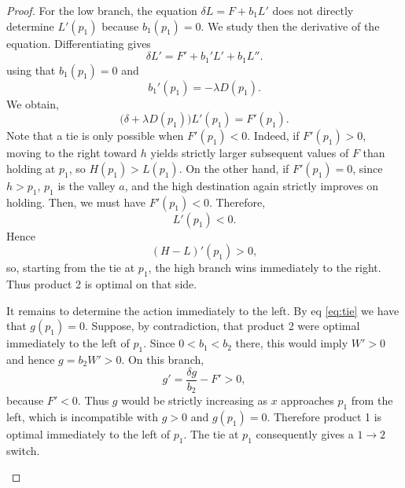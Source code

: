 \documentclass[11pt]{article}
\begin{document}
\begin{proof}
For the low branch, the equation $\delta L=F+b_1L'$ does not directly determine $L'(p_1)$ because $b_1(p_1)=0$. We study then the derivative of the equation. Differentiating gives
\begin{equation*}
    \delta L' = F'+b_1'L'+b_1L''.
\end{equation*}
using that $b_1(p_1)=0$ and 
\begin{equation*}
    b_1'(p_1) = -\lambda D(p_1).
\end{equation*}
We obtain,
\begin{equation*}
    \bigl(\delta+\lambda D(p_1)\bigr)L'(p_1)= F'(p_1).
\end{equation*}
Note that a tie is only possible when $F'(p_1)<0$. Indeed, if $F'(p_1)>0$, moving to the right toward $h$ yields strictly larger subsequent values of $F$ than holding at $p_1$, so $H(p_1)>L(p_1)$. On the other hand, if $F'(p_1)=0$, since $h>p_1$, $p_1$ is the valley $a$, and the high destination again strictly improves on holding. Then, we must have $F'(p_1)<0$. Therefore,
\begin{equation*}
    L'(p_1)<0.
\end{equation*}
Hence
\begin{equation*}
    (H-L)'(p_1)>0,
\end{equation*}
so, starting from the tie at $p_1$, the high branch wins immediately to the right. Thus product 2 is optimal on that side.

It remains to determine the action immediately to the left. By eq \eqref{eq:tie} we have that $g(p_1)=0$. Suppose, by contradiction, that product 2 were optimal immediately to the
left of $p_1$. Since $0<b_1<b_2$ there, this would imply $W'>0$ and hence $g=b_2W'>0$. On this branch,
\begin{equation*}
    g'=\frac{\delta g}{b_2}-F'>0,
\end{equation*}
because $F'<0$. Thus $g$ would be strictly increasing as $x$ approaches $p_1$ from the left, which is incompatible with $g>0$ and $g(p_1)=0$. Therefore product 1 is optimal immediately to the left of $p_1$. The tie at $p_1$ consequently gives a $1\to2$ switch.

\begin{figure}[H]
\centering
{}
\end{figure}


\end{proof}
\end{document}
